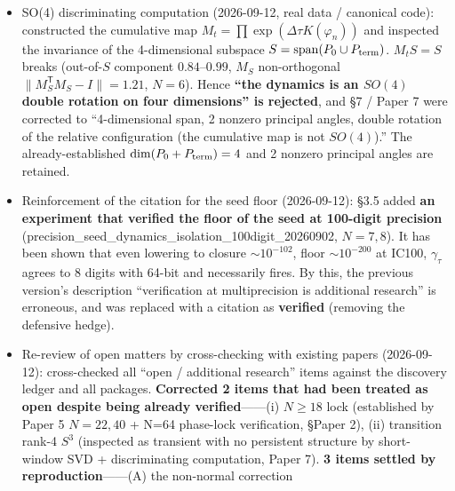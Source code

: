 \documentclass[
  a4paper,
]{ltjsarticle}
\begin{document}
\begin{itemize}
  \(\mu=-4.899\), both the minimal eigenvalue of \(iK\)). The notation
  ``the maximal eigenvalue of \(iK\)'' of §3.3 and Paper 3 was
  sign-inconsistent and was corrected (the designation
  \(\sigma_{\max}=|\mu|\) = spectral radius = maximal singular value is
  retained; the form of the floor is \(z=\sigma_{\max}u-iKu\)). Note
  that the \(|\mu_{\max}|\) of §6 and Paper 6 is the spectral radius of
  the floor Jacobian \(J\) and is a quantity distinct from this \(\mu\).
\item
  SO(4) discriminating computation (2026-09-12, real data / canonical
  code): constructed the cumulative map
  \(M_t=\prod\exp(\Delta\tau K(\varphi_n))\) and inspected the
  invariance of the 4-dimensional subspace
  \(S=\mathrm{span}(P_0\cup P_{\rm term})\). \(M_tS=S\) breaks
  (out-of-\(S\) component \(0.84\)--\(0.99\), \(M_S\) non-orthogonal
  \(\|M_S^{\mathsf T}M_S-I\|=1.21\), \(N=6\)). Hence \textbf{``the
  dynamics is an \(SO(4)\) double rotation on four dimensions'' is
  rejected}, and §7 / Paper 7 were corrected to ``4-dimensional span, 2
  nonzero principal angles, double rotation of the relative
  configuration (the cumulative map is not \(SO(4)\)).'' The
  already-established \(\dim(P_0+P_{\rm term})=4\) and 2 nonzero
  principal angles are retained.
\item
  Reinforcement of the citation for the seed floor (2026-09-12): §3.5
  added \textbf{an experiment that verified the floor of the seed at
  100-digit precision}
  (precision\_seed\_dynamics\_isolation\_100digit\_20260902, \(N=7,8\)).
  It has been shown that even lowering to closure \(\sim10^{-102}\),
  floor \(\sim10^{-200}\) at IC100, \(\gamma_\tau\) agrees to 8 digits
  with 64-bit and necessarily fires. By this, the previous version's
  description ``verification at multiprecision is additional research''
  is erroneous, and was replaced with a citation as \textbf{verified}
  (removing the defensive hedge).
\item
  Re-review of open matters by cross-checking with existing papers
  (2026-09-12): cross-checked all ``open / additional research'' items
  against the discovery ledger and all packages. \textbf{Corrected 2
  items that had been treated as open despite being already
  verified}------(i) \(N\ge18\) lock (established by Paper 5 \(N=22,40\)
  + N=64 phase-lock verification, §Paper 2), (ii) transition rank-4
  \(S^3\) (inspected as transient with no persistent structure by
  short-window SVD + discriminating computation, Paper 7). \textbf{3
  items settled by reproduction}------(A) the non-normal correction

\end{itemize}
\end{document}
